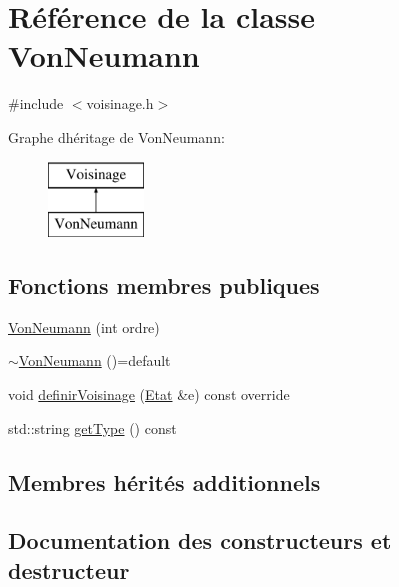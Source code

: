 \hypertarget{class_von_neumann}{}\section{Référence de la classe Von\+Neumann}
\label{class_von_neumann}


{\ttfamily \#include $<$voisinage.\+h$>$}

Graphe d\textquotesingle{}héritage de Von\+Neumann\+:\begin{figure}[H]
\begin{center}
\leavevmode
\includegraphics[height=2.000000cm]{class_von_neumann}
\end{center}
\end{figure}
\subsection*{Fonctions membres publiques}
\begin{DoxyCompactItemize}
\item 
\mbox{\hyperlink{class_von_neumann_a929545e0047d0022075e7b376d0c6530}{Von\+Neumann}} (int ordre)
\item 
\mbox{\hyperlink{class_von_neumann_ac499842c3b775df77ad7d16bea19a911}{$\sim$\+Von\+Neumann}} ()=default
\item 
void \mbox{\hyperlink{class_von_neumann_a7e85faf5f9bedb3d1fef9b9536aeba4f}{definir\+Voisinage}} (\mbox{\hyperlink{class_etat}{Etat}} \&e) const override
\item 
std\+::string \mbox{\hyperlink{class_von_neumann_ab969490492cff92c8e0efcfc72e492b9}{get\+Type}} () const
\end{DoxyCompactItemize}
\subsection*{Membres hérités additionnels}


\subsection{Documentation des constructeurs et destructeur}
\mbox{\label{class_von_neumann_a929545e0047d0022075e7b376d0c6530}} 
